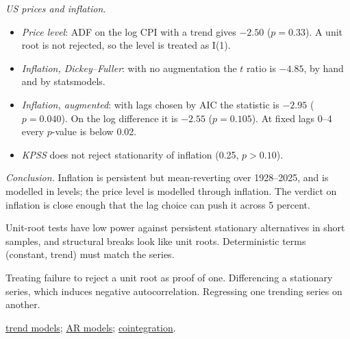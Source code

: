 \begin{qfdefinition}
\emph{US prices and inflation.}
\begin{itemize}
\item \emph{Price level}: ADF on the log CPI with a trend gives $-2.50$ ($p=0.33$). A unit root is not rejected, so the level is treated as I(1).
\item \emph{Inflation, Dickey--Fuller}: with no augmentation the $t$ ratio is $-4.85$, by hand and by statsmodels.
\item \emph{Inflation, augmented}: with lags chosen by AIC the statistic is $-2.95$ ($p=0.040$). On the log difference it is $-2.55$ ($p=0.105$). At fixed lags 0--4 every $p$-value is below 0.02.
\item \emph{KPSS} does not reject stationarity of inflation (0.25, $p>0.10$).
\end{itemize}
\emph{Conclusion.} Inflation is persistent but mean-reverting over 1928--2025, and is modelled in levels; the price level is modelled through inflation. The verdict on inflation is close enough that the lag choice can push it across 5 percent.

 Unit-root tests have low power against persistent stationary alternatives in short samples, and structural breaks look like unit roots. Deterministic terms (constant, trend) must match the series.

 Treating failure to reject a unit root as proof of one. Differencing a stationary series, which induces negative autocorrelation. Regressing one trending series on another.

 \hyperref[meth:trend-models]{trend models}; \hyperref[meth:autoregressive-forecasting]{AR models}; \hyperref[meth:cointegration-testing]{cointegration}.

\end{qfdefinition}

